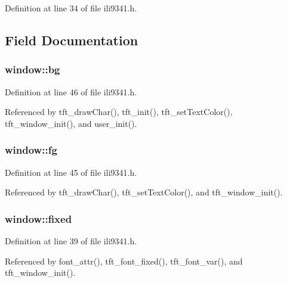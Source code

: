 Definition at line 34 of file ili9341.\-h.



\subsection{Field Documentation}
\hypertarget{structwindow_affcf5d29153103c2537542f5a4f8ba87}{
\subsubsection[{bg}]{ window\-::bg}}\label{structwindow_affcf5d29153103c2537542f5a4f8ba87}


Definition at line 46 of file ili9341.\-h.



Referenced by tft\-\_\-draw\-Char(), tft\-\_\-init(), tft\-\_\-set\-Text\-Color(), tft\-\_\-window\-\_\-init(), and user\-\_\-init().

\hypertarget{structwindow_ac8739cdb3c50efcc1deaa5ab955a5e62}{
\subsubsection[{fg}]{ window\-::fg}}\label{structwindow_ac8739cdb3c50efcc1deaa5ab955a5e62}


Definition at line 45 of file ili9341.\-h.



Referenced by tft\-\_\-draw\-Char(), tft\-\_\-set\-Text\-Color(), and tft\-\_\-window\-\_\-init().

\hypertarget{structwindow_a39a810713bcc5f9054a4a8a52d9efcc7}{
\subsubsection[{fixed}]{ window\-::fixed}}\label{structwindow_a39a810713bcc5f9054a4a8a52d9efcc7}


Definition at line 39 of file ili9341.\-h.



Referenced by font\-\_\-attr(), tft\-\_\-font\-\_\-fixed(), tft\-\_\-font\-\_\-var(), and tft\-\_\-window\-\_\-init().

